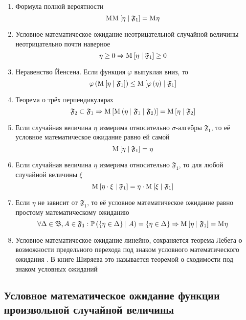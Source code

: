 \begin{enumerate}
    \item Формула полной вероятности \cite[стр.~144]{BorovkovMS}
        $$\mathrm{M}_{} \mathrm{M}_{} \left[  \eta \mid \mathfrak{F}_1  \right] = \mathrm{M}_{} \eta$$
    \item Условное математическое ожидание неотрицательной случайной величины
        неотрицательно почти наверное
        $$\eta \ge 0
            \Rightarrow \mathrm{M}_{} \left[  \eta \mid \mathfrak{F}_1  \right] \ge 0$$
    \item Неравенство Йенсена. Если функция $\varphi$ выпуклая вниз, то
        $$\varphi\left( \mathrm{M}_{} \left[  \eta \mid \mathfrak{F}_1  \right] \right)
            \le \mathrm{M}_{} \left[ \varphi\left( \eta \right) \mid \mathfrak{F}_1 \right]$$
    \item Теорема о трёх перпендикулярах
        $$\mathfrak{F}_2 \subset \mathfrak{F}_1 \Rightarrow
            \mathrm{M}_{} \left[  \mathrm{M}_{} \left( \eta \mid \mathfrak{F}_1
                \mid \mathfrak{F}_2 \right) \right]
            = \mathrm{M}_{} \left[  \eta \mid \mathfrak{F}_2  \right]$$
    \item Если случайная величина $\eta$ измерима
        относительно $\sigma$-алгебры $\mathfrak{F}_1$,
        то её условное математическое ожидание равно ей самой
        $$\mathrm{M}_{} \left[  \eta \mid \mathfrak{F}_1  \right] = \eta$$
    \item Если случайная величина $\eta$ измерима
        относительно $\mathfrak{F}_1$, то для любой случайной величины $\xi$
        $$\mathrm{M}_{} \left[  \eta \cdot \xi \mid \mathfrak{F}_1  \right]
            = \eta \cdot \mathrm{M}_{} \left[  \xi \mid \mathfrak{F}_1  \right]$$
    \item Если $\eta$ не зависит от $\mathfrak{F}_1$,
        то её условное математическое ожидание
        равно простому математическому ожиданию
        $$\forall \Delta \in \mathfrak{B}, A \in \mathfrak{F}_1:
            \mathbb{P}\left(  \left\{ \eta \in \Delta \right\} \mid A \right)
                = \left\{ \eta \in \Delta \right\}
            \Rightarrow \mathrm{M}_{} \left[  \eta \mid \mathfrak{F}_1  \right]
                = \mathrm{M}_{} \eta$$
    \item Условное математическое ожидание линейно,
        сохраняется теорема Лебега о возможности предельного перехода
        под знаком условного математического ожидания
        \cite[стр.~302]{KolmogorovFA}.
        В книге Ширяева это называется теоремой о сходимости
        под знаком условных ожиданий \cite[стр.~272]{Shiryayev1}
\end{enumerate}

\subsection{Условное математическое ожидание функции
    произвольной случайной величины}

